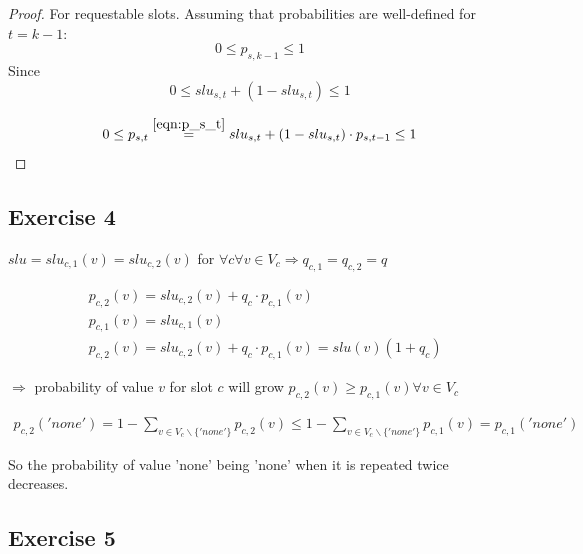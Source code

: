 \documentclass[12pt,titlepage,a4paper]{article}
\begin{document}
\begin{proof}
    For requestable slots.
    Assuming that probabilities are well-defined for $t = k-1$:
    \begin{equation}
        0 \leq p_{s,k-1} \leq 1
    \end{equation}
    Since
    \begin{equation}
        0 \leq slu_{s,t} + (1 - slu_{s,t}) \leq 1
    \end{equation}

    \begin{equation}
        0 \leq p_{s,t} \overset{\ref{eqn:p_s_t}}{=} slu_{s,t} + (1 - slu_{s,t}) \cdot p_{s,t-1} \leq 1
    \end{equation}
\end{proof}

\subsection{Exercise 4}

$slu = slu_{c, 1}(v) = slu_{c,2}(v)$ for $\forall c \forall v \in V_c \Rightarrow q_{c,1} = q_{c, 2} = q$

\begin{equation}
    \begin{aligned}
        &p_{c,2}(v) = slu_{c,2}(v) + q_c \cdot p_{c, 1}(v) 
        \\
        &p_{c,1}(v) = slu_{c,1}(v)
        \\
        &p_{c, 2}(v) = slu_{c,2}(v) + q_c \cdot p_{c, 1}(v) = slu(v)(1 + q_c)
    \end{aligned}
\end{equation}

$\Rightarrow$ probability of value $v$  for slot $c$ will grow $p_{c,2}(v) \geq p_{c,1}(v) \forall v \in V_c $

\begin{equation}
    \begin{aligned}
        p_{c,2}('none') = 1 - \sum_{v \in V_{c} \backslash \{'none'\}} p_{c,2}(v) \leq 1 - \sum_{v \in V_{c} \backslash \{'none'\}} p_{c,1}(v)  = p_{c,1}('none')
    \end{aligned}
\end{equation}

So the probability of value 'none' being 'none' when it is repeated twice decreases.

\subsection{Exercise 5}
\end{document}
